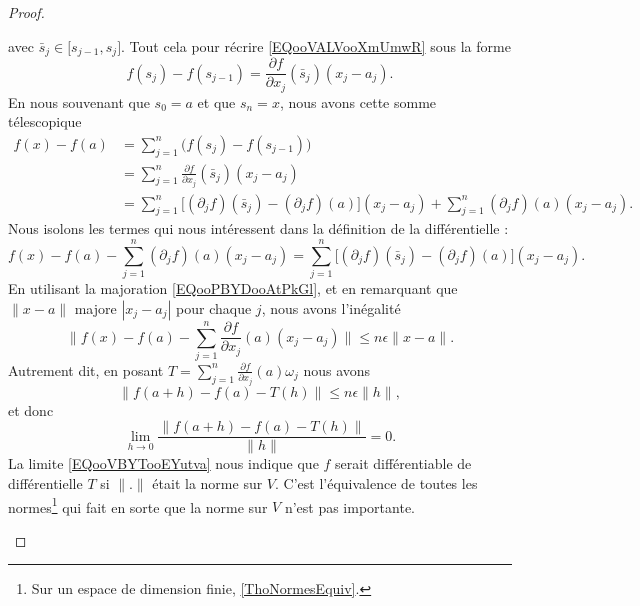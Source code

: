 \begin{proof}
\begin{subproof}
		avec \( \bar s_j\in\mathopen[ s_{j-1} , s_j \mathclose]\). Tout cela pour récrire \eqref{EQooVALVooXmUmwR} sous la forme
		\begin{equation}
			f(s_j)-f(s_{j-1})=\frac{ \partial f }{ \partial x_j }(\bar s_j)(x_j-a_j).
		\end{equation}
		En nous souvenant que \( s_0=a\) et que \( s_n=x\), nous avons cette somme télescopique
		\begin{subequations}
			\begin{align}
				f(x)-f(a) & =\sum_{j=1}^n\big( f(s_j)-f(s_{j-1}) \big)                                                                        \\
				          & =\sum_{j=1}^n\frac{ \partial f }{ \partial x_j }(\bar s_j)(x_j-a_j)                                               \\
				          & =\sum_{j=1}^n\big[ (\partial_jf)(\bar s_j)-(\partial_jf)(a) \big](x_j-a_j)+\sum_{j=1}^n(\partial_jf)(a)(x_j-a_j).
			\end{align}
		\end{subequations}
		Nous isolons les termes qui nous intéressent dans la définition de la différentielle :
		\begin{equation}
			f(x)-f(a)-\sum_{j=1}^n(\partial_jf)(a)(x_j-a_j)=\sum_{j=1}^n\big[ (\partial_jf)(\bar s_j)-(\partial_jf)(a) \big](x_j-a_j).
		\end{equation}
		En utilisant la majoration \eqref{EQooPBYDooAtPkGl}, et en remarquant que \( \| x-a \|\) majore \( | x_j-a_j |\) pour chaque \( j\), nous avons l'inégalité
		\begin{equation}
			\| f(x)-f(a)-\sum_{j=1}^n\frac{ \partial f }{ \partial x_j }(a)(x_j-a_j) \|\leq n\epsilon\| x-a \|.
		\end{equation}
		Autrement dit, en posant \( T=\sum_{j=1}^n\frac{ \partial f }{ \partial x_j }(a)\omega_j\) nous avons
		\begin{equation}
			\| f(a+h)-f(a)-T(h) \|\leq n\epsilon\| h \|,
		\end{equation}
		et donc
		\begin{equation}        \label{EQooVBYTooEYutva}
			\lim_{h\to 0} \frac{ \| f(a+h)-f(a)-T(h) \| }{ \| h \| }=0.
		\end{equation}
		\spitem[Et donc ?]
		La limite \eqref{EQooVBYTooEYutva} nous indique que \( f\) serait différentiable de différentielle \( T\) si \( \| . \|\) était la norme sur \( V\). C'est l'équivalence de toutes les normes\footnote{Sur un espace de dimension finie, \ref{ThoNormesEquiv}.} qui fait en sorte que la norme sur \( V\) n'est pas importante.
	\end{subproof}
\end{proof}

